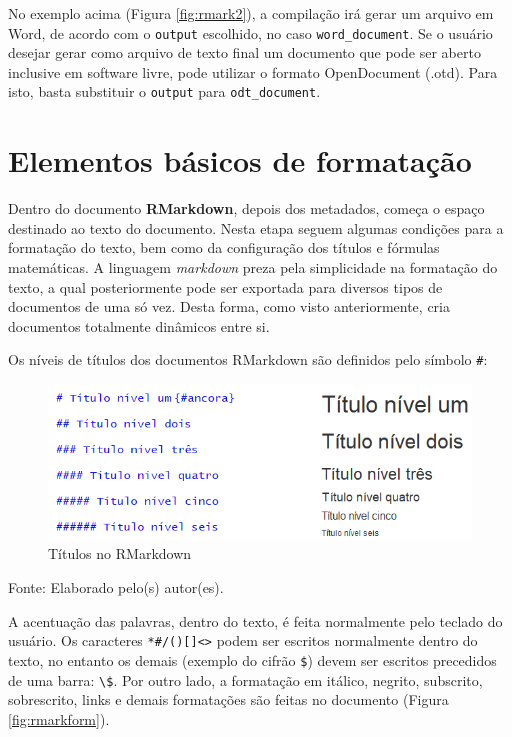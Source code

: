\documentclass[12pt,brazil,oneside]{book}
\begin{document}
No exemplo acima (Figura \ref{fig:rmark2}), a compilação irá gerar um arquivo em Word, de acordo com o \texttt{output} escolhido, no caso \texttt{word\_document}. Se o usuário desejar gerar como arquivo de texto final um documento que pode ser aberto inclusive em software livre, pode utilizar o formato OpenDocument (.otd). Para isto, basta substituir o \texttt{output} para \texttt{odt\_document}.

\hypertarget{elementos-basicos-de-formatacao}{%
\section{Elementos básicos de formatação}\label{elementos-basicos-de-formatacao}}

Dentro do documento \textbf{RMarkdown}, depois dos metadados, começa o espaço destinado ao texto do documento. Nesta etapa seguem algumas condições para a formatação do texto, bem como da configuração dos títulos e fórmulas matemáticas. A linguagem \emph{markdown} preza pela simplicidade na formatação do texto, a qual posteriormente pode ser exportada para diversos tipos de documentos de uma só vez. Desta forma, como visto anteriormente, cria documentos totalmente dinâmicos entre si.

Os níveis de títulos dos documentos RMarkdown são definidos pelo símbolo \texttt{\#}:

\begin{figure}[H]

{\centering \includegraphics[width=0.8\linewidth]{rmarktit} 

}

\caption{Títulos no RMarkdown}\label{fig:rmarktit}
\end{figure}

Fonte: Elaborado pelo(s) autor(es).

A acentuação das palavras, dentro do texto, é feita normalmente pelo teclado do usuário. Os caracteres \texttt{*\#/(){[}{]}\textless{}\textgreater{}} podem ser escritos normalmente dentro do texto, no entanto os demais (exemplo do cifrão \texttt{\$}) devem ser escritos precedidos de uma barra: \texttt{\textbackslash{}\$}. Por outro lado, a formatação em itálico, negrito, subscrito, sobrescrito, links e demais formatações são feitas no documento (Figura \ref{fig:rmarkform}).
\end{document}
